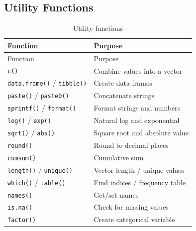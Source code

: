\documentclass[
  letterpaper,
  DIV=11,
  numbers=noendperiod]{scrreprt}
\begin{document}
\subsection{Utility Functions}\label{utility-functions-1}

\begin{longtable}[]{@{}ll@{}}
\caption{Utility functions}\label{tbl-util-ref}\tabularnewline
\toprule\noalign{}
Function & Purpose \\
\midrule\noalign{}
\endfirsthead
\toprule\noalign{}
Function & Purpose \\
\midrule\noalign{}
\endhead
\bottomrule\noalign{}
\endlastfoot
\texttt{c()} & Combine values into a vector \\
\texttt{data.frame()} / \texttt{tibble()} & Create data frames \\
\texttt{paste()} / \texttt{paste0()} & Concatenate strings \\
\texttt{sprintf()} / \texttt{format()} & Format strings and numbers \\
\texttt{log()} / \texttt{exp()} & Natural log and exponential \\
\texttt{sqrt()} / \texttt{abs()} & Square root and absolute value \\
\texttt{round()} & Round to decimal places \\
\texttt{cumsum()} & Cumulative sum \\
\texttt{length()} / \texttt{unique()} & Vector length / unique values \\
\texttt{which()} / \texttt{table()} & Find indices / frequency table \\
\texttt{names()} & Get/set names \\
\texttt{is.na()} & Check for missing values \\
\texttt{factor()} & Create categorical variable \\
\end{longtable}
\end{document}
